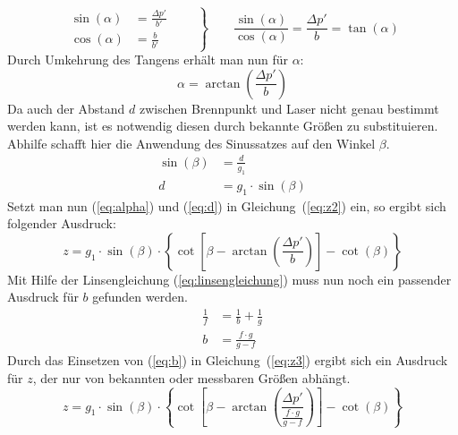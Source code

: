 \begin{equation}
	\left.\begin{aligned}
		\sin(\alpha) &= \frac{\Delta p'}{b'}\\
	\cos(\alpha) &= \frac{b}{b'}
	\end{aligned}\qquad\right\}\qquad
	\frac{\sin(\alpha)}{\cos(\alpha)} = \frac{\Delta p'}{b} = \tan(\alpha)
\end{equation}
Durch Umkehrung des Tangens erhält man nun für $\alpha$:
\begin{equation}
	\alpha = \arctan\left(\frac{\Delta p'}{b}\right)
	\label{eq:alpha}
\end{equation}
Da auch der Abstand $d$ zwischen Brennpunkt und Laser nicht genau bestimmt werden kann, ist es notwendig diesen durch bekannte Größen zu substituieren. Abhilfe schafft hier die Anwendung des Sinussatzes auf den Winkel $\beta$.
\begin{align}
	\sin(\beta) &= \frac{d}{g_1}\\
	d &= g_1\cdot\sin(\beta)
	\label{eq:d}
\end{align}
Setzt man nun (\ref{eq:alpha}) und (\ref{eq:d}) in Gleichung~(\ref{eq:z2}) ein, so ergibt sich folgender Ausdruck:
\begin{equation}
	z = g_1\cdot\sin(\beta)\cdot\left\{\cot\left[\beta-\arctan\left(\frac{\Delta p'}{b}\right)\right]-\cot(\beta)\right\}
	\label{eq:z3}
\end{equation}
Mit Hilfe der Linsengleichung (\ref{eq:linsengleichung}) muss nun noch ein passender Ausdruck für $b$ gefunden werden.
\begin{align}
	\frac{1}{f} &= \frac{1}{b} + \frac{1}{g} \label{eq:linsengleichung}\\
	b &= \frac{f\cdot g}{g-f} \label{eq:b}
\end{align}
Durch das Einsetzen von (\ref{eq:b}) in Gleichung~(\ref{eq:z3}) ergibt sich ein Ausdruck für $z$, der nur von bekannten oder messbaren Größen abhängt. 
\begin{equation}
	z = g_1\cdot\sin(\beta)\cdot\left\{\cot\left[\beta-\arctan\left(\frac{\Delta p'}{\frac{f\cdot g}{g-f}}\right)\right]-\cot(\beta)\right\}
	\label{eq:zfinal}
\end{equation}